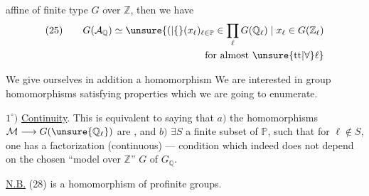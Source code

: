 
affine of finite type \(G\) over \(\mathbb{Z}\), then we have
\[
\begin{gathered}
(25)\qquad G(\mathcal{A}_{\mathbb{Q}})\simeq
\unsure{(|\{}(x_{\ell})_{\ell\in\mathbb{P}}\in\prod_{\ell}G(\mathbb{Q}_{\ell})
\mid x_{\ell}\in G(\mathbb{Z}_{\ell})\\
\hfill\text{for almost }\unsure{\mathrm{tt}|\forall}\ell\}
\end{gathered}
\]


We give ourselves in addition a homomorphism
We are interested in  group homomorphisms
satisfying properties which we are going to enumerate.

\(1^\circ)\) \uline{Continuity}. This is equivalent to saying that \(a)\) the homomorphisms \(\mathcal{M}\longrightarrow G(\unsure{\mathbb{Q}_{\ell}})\) are , and \(b)\) \(\exists S\) a finite subset of \(\mathbb{P}\), such that for \(\ell\notin S\), one has  a factorization (continuous)
--- condition which indeed does not depend on the chosen ``model over \(\mathbb{Z}\)'' \(G\) of \(G_{\mathbb{Q}}\).

\uline{N.B.} (28) is a homomorphism of profinite groups.